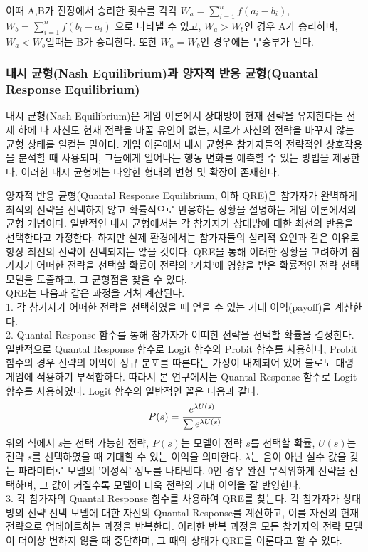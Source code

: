 이때 A,B가 전장에서 승리한 횟수를 각각 $W_a=\sum\limits_{i=1}^n f(a_i-b_i)$, $W_b=\sum\limits_{i=1}^n f(b_i-a_i)$ 으로 나타낼 수 있고, $W_a>W_b$인 경우 A가 승리하며, $W_a<W_b$일때는 B가 승리한다. 또한 $W_a=W_b$인 경우에는 무승부가 된다.

\subsubsection{내시 균형(Nash Equilibrium)과 양자적 반응 균형(Quantal Response Equilibrium)}
내시 균형(Nash Equilibrium)은 게임 이론에서 상대방이 현재 전략을 유지한다는 전제 하에 나 자신도 현재 전략을 바꿀 유인이 없는, 서로가 자신의 전략을 바꾸지 않는 균형 상태를 일컫는 말이다. 게임 이론에서 내시 균형은 참가자들의 전략적인 상호작용을 분석할 때 사용되며, 그들에게 일어나는 행동 변화를 예측할 수 있는 방법을 제공한다. 이러한 내시 균형에는 다양한 형태의 변형 및 확장이 존재한다.

양자적 반응 균형(Quantal Response Equilibrium, 이하 QRE)은 참가자가 완벽하게 최적의 전략을 선택하지 않고 확률적으로 반응하는 상황을 설명하는 게임 이론에서의 균형 개념이다. 일반적인 내시 균형에서는 각 참가자가 상대방에 대한 최선의 반응을 선택한다고 가정한다. 하지만 실제 환경에서는 참가자들의 심리적 요인과 같은 이유로 항상 최선의 전략이 선택되지는 않을 것이다. QRE을 통해 이러한 상황을 고려하여 참가자가 어떠한 전략을 선택할 확률이 전략의 '가치'에 영향을 받은 확률적인 전략 선택 모델을 도출하고, 그 균형점을 찾을 수 있다.\\
QRE는 다음과 같은 과정을 거쳐 계산된다.\\
1. 각 참가자가 어떠한 전략을 선택하였을 때 얻을 수 있는 기대 이익(payoff)을 계산한다.\\
2. Quantal Response 함수를 통해 참가자가 어떠한 전략을 선택할 확률을 결정한다. 일반적으로 Quantal Response 함수로 Logit 함수와 Probit 함수를 사용하나, Probit 함수의 경우 전략의 이익이 정규 분포를 따른다는 가정이 내제되어 있어 블로토 대령 게임에 적용하기 부적합하다. 따라서 본 연구에서는 Quantal Response 함수로 Logit 함수를 사용하였다. Logit 함수의 일반적인 꼴은 다음과 같다.
\begin{align}
    P(s)=\cfrac{e^{\lambda U(s)}}{\sum e^{\lambda U(s)}}
\end{align}
위의 식에서 $s$는 선택 가능한 전략, $P(s)$는 모델이 전략 $s$를 선택할 확률, $U(s)$는 전략 $s$를 선택하였을 때 기대할 수 있는 이익을 의미한다. $\lambda$는 음이 아닌 실수 값을 갖는 파라미터로 모델의 '이성적' 정도를 나타낸다. 0인 경우 완전 무작위하게 전략을 선택하며, 그 값이 커질수록 모델이 더욱 전략의 기대 이익을 잘 반영한다.\\
3. 각 참가자의 Quantal Response 함수를 사용하여 QRE를 찾는다. 각 참가자가 상대방의 전략 선택 모델에 대한 자신의 Quantal Response를 계산하고, 이를 자신의 현재 전략으로 업데이트하는 과정을 반복한다. 이러한 반복 과정을 모든 참가자의 전략 모델이 더이상 변하지 않을 때 중단하며, 그 때의 상태가 QRE를 이룬다고 할 수 있다.